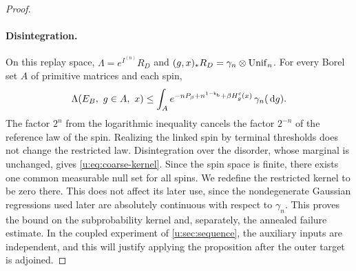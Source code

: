 \begin{proof}
\paragraph{Disintegration.}
On this replay space, $\Lambda=e^{I^{(n)}}R_D$ and $(g,x)_*R_D=\gamma_n\otimes\operatorname{Unif}_n$. For every Borel set $A$ of primitive matrices and each spin,
\[
 \Lambda(E_B,\ g\in A,\ x)
 \le\int_A e^{-nP_\beta+n^{1-\mathsf{k}_{\rm b}}+\beta H^c_g(x)}\,
                   \gamma_n(\,\mathrm d g).
\]
The factor $2^n$ from the logarithmic inequality cancels the factor $2^{-n}$ of the reference law of the spin. Realizing the linked spin by terminal thresholds does not change the restricted law. Disintegration over the disorder, whose marginal is unchanged, gives \eqref{u:eq:coarse-kernel}. Since the spin space is finite, there exists one common measurable null set for all spins. We redefine the restricted kernel to be zero there. This does not affect its later use, since the nondegenerate Gaussian regressions used later are absolutely continuous with respect to $\gamma_n$. This proves the bound on the subprobability kernel and, separately, the annealed failure estimate. In the coupled experiment of \cref{u:sec:sequence}, the auxiliary inputs are independent, and this will justify applying the proposition after the outer target is adjoined.
\end{proof}
